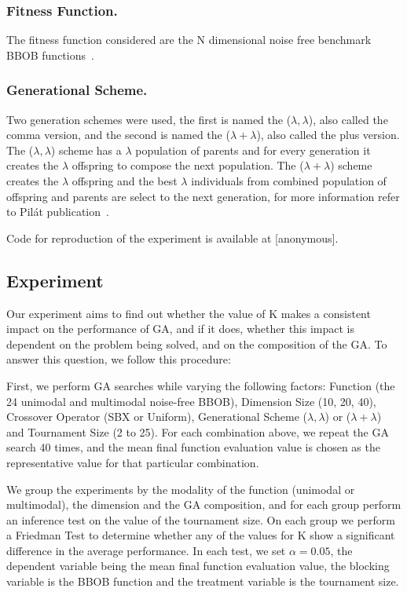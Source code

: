 \subsubsection*{Fitness Function.}
The fitness function considered are the N dimensional noise free
benchmark BBOB functions~\cite{hansen2010real}.

\subsubsection*{Generational Scheme.}
Two generation schemes were used, the first is named the ($\lambda,
\lambda$), also called the comma version, and the second is named the
($\lambda + \lambda$), also called the plus version. The ($\lambda,
\lambda$) scheme has a $\lambda$ population of parents and for every
generation it creates the $\lambda$ offspring to compose the next
population. The ($\lambda + \lambda$) scheme creates the $\lambda$
offspring and the best $\lambda$ individuals from combined population
of offspring and parents are select to the next
generation, for more information refer to Pil{\'a}t publication~\cite{pilat2017parallel}.

Code for reproduction of the experiment is available at [anonymous].

\subsection{Experiment}\label{sec:experiment}

Our experiment aims to find out whether the value of K makes a
consistent impact on the performance of GA, and if it does, whether
this impact is dependent on the problem being solved, and on the
composition of the GA. To answer this question, we follow this procedure:

First, we perform GA searches while varying the following factors:
Function (the 24 unimodal and multimodal noise-free BBOB), Dimension
Size (10, 20, 40), Crossover Operator (SBX or Uniform), Generational
Scheme ($\lambda, \lambda$) or ($\lambda + \lambda$) and Tournament
Size (2 to 25). For each combination above, we repeat the GA search 40
times, and the mean final function evaluation value is chosen as the
representative value for that particular combination.

We group the experiments by the modality of the function (unimodal or
multimodal), the dimension and the GA composition, and for each group
perform an inference test on the value of the tournament size. On each
group we perform a Friedman Test to determine whether any of the
values for K show a significant difference in the average
performance. In each test, we set $\alpha = 0.05$, the dependent
variable being the mean final function evaluation value, the blocking
variable is the BBOB function and the treatment variable is the
tournament size.




